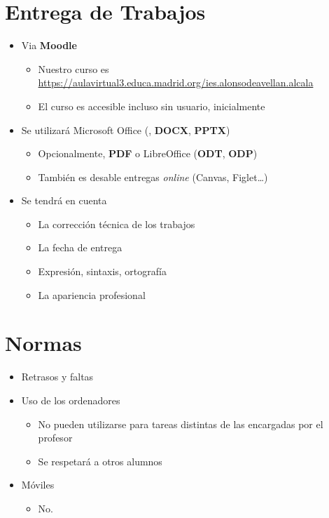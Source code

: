\documentclass[a4paper]{article}
\begin{document}
\section{Entrega de Trabajos}
\label{sec:org0000006}
\begin{itemize}
\item Via \textbf{Moodle}
\begin{itemize}
\item Nuestro curso es \url{https://aulavirtual3.educa.madrid.org/ies.alonsodeavellan.alcala}
\item El curso es accesible incluso sin usuario, inicialmente
\end{itemize}
\item Se utilizará Microsoft Office (, \textbf{DOCX}, \textbf{PPTX})
\begin{itemize}
\item Opcionalmente, \textbf{PDF} o LibreOffice (\textbf{ODT}, \textbf{ODP})
\item También es desable entregas \emph{online} (Canvas, Figlet\ldots{})
\end{itemize}
\item Se tendrá en cuenta
\begin{itemize}
\item La corrección técnica de los trabajos
\item La fecha de entrega
\item Expresión, sintaxis, ortografía
\item La apariencia profesional
\end{itemize}
\end{itemize}
\section{Normas}
\label{sec:org000000c}
\begin{itemize}
\item Retrasos y faltas
\item Uso de los ordenadores
\begin{itemize}
\item No pueden utilizarse para tareas distintas de las encargadas por el profesor
\item Se respetará a otros alumnos
\end{itemize}
\item Móviles
\begin{itemize}
\item No.
\end{itemize}
\end{itemize}
\end{document}

